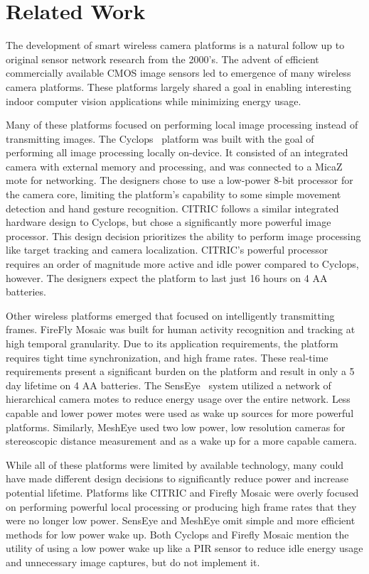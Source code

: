\section{Related Work}
The development of smart wireless camera platforms is a natural follow up to original sensor network research from the 2000's. The advent of efficient commercially available CMOS image sensors led to emergence of many wireless camera platforms. These platforms largely shared a goal in enabling interesting indoor computer vision applications while minimizing energy usage.

Many of these platforms focused on performing local image processing instead of transmitting images.
The Cyclops~\cite{rahimi2005cyclops} platform was built with the goal of performing all image processing locally on-device. It consisted of an integrated camera with external memory and processing, and was connected to a MicaZ mote for networking. The designers chose to use a low-power 8-bit processor for the camera core, limiting the platform's capability to some simple movement detection and hand gesture recognition.
CITRIC \cite{chen2008citric} follows a similar integrated hardware design to Cyclops, but chose a significantly more powerful image processor. This design decision prioritizes the ability to perform image processing like target tracking and camera localization. CITRIC's powerful processor requires an order of magnitude more active and idle power compared to Cyclops, however. The designers expect the platform to last just 16 hours on 4 AA batteries. 

Other wireless platforms emerged that focused on intelligently transmitting frames.
FireFly Mosaic \cite{rowe2007firefly} was built for human activity recognition and tracking at high temporal granularity. Due to its application requirements, the platform requires tight time synchronization, and high frame rates. These real-time requirements present a significant burden on the platform and result in only a 5 day lifetime on 4 AA batteries.
The SensEye~\cite{kulkarni2005senseye} system utilized a network of hierarchical camera motes to reduce energy usage over the entire network. Less capable and lower power motes were used as wake up sources for more powerful platforms. Similarly, MeshEye used two low power, low resolution cameras for stereoscopic distance measurement and as a wake up for a more capable camera.

While all of these platforms were limited by available technology, many could have made different design decisions to significantly reduce power and increase potential lifetime. Platforms like CITRIC and Firefly Mosaic were overly focused on performing powerful local processing or producing high frame rates that they were no longer low power. SensEye and MeshEye omit simple and more efficient methods for low power wake up. Both Cyclops and Firefly Mosaic mention the utility of using a low power wake up like a PIR sensor to reduce idle energy usage and unnecessary image captures, but do not implement it. 

